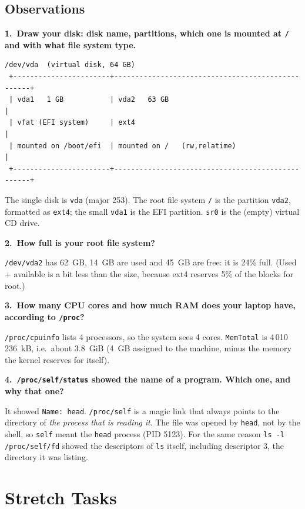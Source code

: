 \documentclass[12pt,a4paper]{article}
\newcommand{\qa}[2]{%
  \par\needspace{5\baselineskip}\medskip
  \noindent\textbf{#1.~#2}\par\smallskip\noindent}
\begin{document}
\subsection*{Observations}

\qa{1}{Draw your disk: disk name, partitions, which one is mounted at \texttt{/} and with what file system type.}

\begin{lstlisting}[style=terminal,caption={Layout of the disk}]
 /dev/vda  (virtual disk, 64 GB)
 +-----------------------+--------------------------------------------------+
 | vda1   1 GB           | vda2   63 GB                                     |
 | vfat (EFI system)     | ext4                                             |
 | mounted on /boot/efi  | mounted on /   (rw,relatime)                     |
 +-----------------------+--------------------------------------------------+
\end{lstlisting}
The single disk is \texttt{vda} (major 253). The root file system \texttt{/} is the partition \texttt{vda2}, formatted as \texttt{ext4}; the small \texttt{vda1} is the EFI partition. \texttt{sr0} is the (empty) virtual CD drive.

\qa{2}{How full is your root file system?}
\texttt{/dev/vda2} has 62~GB, 14~GB are used and 45~GB are free: it is 24\% full. (Used + available is a bit less than the size, because ext4 reserves 5\% of the blocks for root.)

\qa{3}{How many CPU cores and how much RAM does your laptop have, according to \texttt{/proc}?}
\texttt{/proc/cpuinfo} lists 4 processors, so the system sees 4 cores. \texttt{MemTotal} is 4\,010\,236~kB, i.e.\ about 3.8~GiB (4~GB assigned to the machine, minus the memory the kernel reserves for itself).

\qa{4}{\texttt{/proc/self/status} showed the name of a program. Which one, and why that one?}
It showed \texttt{Name: head}. \texttt{/proc/self} is a magic link that always points to the directory of \textit{the process that is reading it}. The file was opened by \texttt{head}, not by the shell, so \texttt{self} meant the \texttt{head} process (PID 5123). For the same reason \texttt{ls -l /proc/self/fd} showed the descriptors of \texttt{ls} itself, including descriptor 3, the directory it was listing.

\newpage
\section{Stretch Tasks}
\end{document}
